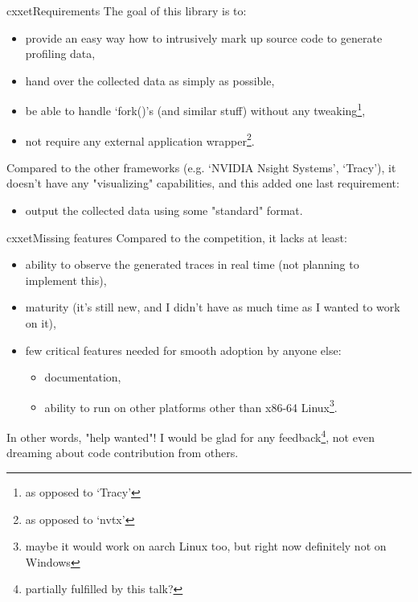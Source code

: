 \documentclass[aspectratio=169]{beamer}
\begin{document}
\begin{frame}{cxxet}{Requirements}
    The goal of this library is to:
    
    \begin{itemize}
        \item \label{easy_usage} provide an easy way how to intrusively mark up source code to generate profiling data,
        \item \label{writing_out_data} hand over the collected data as simply as possible,
        \item \label{fork_handling} be able to handle `fork()'s (and similar stuff) without any tweaking\footnote{as opposed to `Tracy'},
        \item \label{no_external_wrapper} not require any external application wrapper\footnote{as opposed to `nvtx'}.
    \end{itemize}

    Compared to the other frameworks (e.g. `NVIDIA Nsight Systems', `Tracy'), it doesn't have any "visualizing" capabilities, and this added one last requirement:

    \begin{itemize}
        \item \label{data_format} output the collected data using some "standard" format.
    \end{itemize}

\end{frame}

\begin{frame}{cxxet}{Missing features}
    Compared to the competition, it lacks at least:

    \begin{itemize}
        \item ability to observe the generated traces in real time (not planning to implement this),
        \item maturity (it's still new, and I didn't have as much time as I wanted to work on it),
        \item few critical features needed for smooth adoption by anyone else:
        \begin{itemize}
            \item documentation,
            \item ability to run on other platforms other than x86-64 Linux\footnote{maybe it would work on aarch Linux too, but right now definitely not on Windows}.
        \end{itemize}
    \end{itemize}

    In other words, "help wanted"! I would be glad for any feedback\footnote{partially fulfilled by this talk?}, not even dreaming about code contribution from others.

\end{frame}
\end{document}
